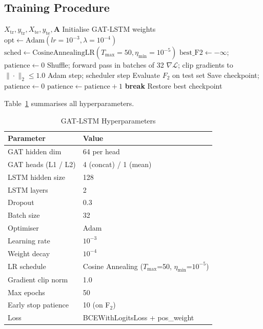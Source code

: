 \documentclass[conference]{IEEEtran}
\begin{document}
\subsection{Training Procedure}

\begin{algorithm}[H]
\caption{GAT-LSTM Training}
\label{alg:train}
\begin{algorithmic}[1]
\REQUIRE $X_{\text{tr}}, y_{\text{tr}}, X_{\text{te}}, y_{\text{te}}, \mathbf{A}$
\STATE Initialise GAT-LSTM weights
\STATE $\text{opt} \leftarrow \text{Adam}(lr{=}10^{-3}, \lambda{=}10^{-4})$
\STATE $\text{sched} \leftarrow \text{CosineAnnealingLR}(T_{\max}{=}50, \eta_{\min}{=}10^{-5})$
\STATE $\text{best\_F2} \leftarrow -\infty$; $\text{patience} \leftarrow 0$
  \STATE Shuffle; forward pass in batches of 32
  \STATE $\nabla\mathcal{L}$; clip gradients to $\|\cdot\|_2 \leq 1.0$
  \STATE Adam step; scheduler step
  \STATE Evaluate $F_2$ on test set
    \STATE Save checkpoint; $\text{patience} \leftarrow 0$
  \ELSE
    \STATE $\text{patience} \leftarrow \text{patience} + 1$
  \ENDIF
    \STATE \textbf{break} 
  \ENDIF
\ENDFOR
\STATE Restore best checkpoint
\end{algorithmic}
\end{algorithm}

Table~\ref{tab:hpgat} summarises all hyperparameters.

\begin{table}[H]
\caption{GAT-LSTM Hyperparameters}
\label{tab:hpgat}
\centering
\renewcommand{\arraystretch}{1.1}
\begin{tabular}{ll}
\toprule
\textbf{Parameter} & \textbf{Value} \\
\midrule
GAT hidden dim      & 64 per head \\
GAT heads (L1 / L2) & 4 (concat) / 1 (mean) \\
LSTM hidden size    & 128 \\
LSTM layers         & 2 \\
Dropout             & 0.3 \\
Batch size          & 32 \\
Optimiser           & Adam \\
Learning rate       & $10^{-3}$ \\
Weight decay        & $10^{-4}$ \\
LR schedule         & Cosine Annealing ($T_{\max}$=50, $\eta_{\min}$=$10^{-5}$) \\
Gradient clip norm  & 1.0 \\
Max epochs          & 50 \\
Early stop patience & 10 (on F$_2$) \\
Loss                & BCEWithLogitsLoss + pos\_weight \\
\bottomrule
\end{tabular}
\end{table}
\end{document}

